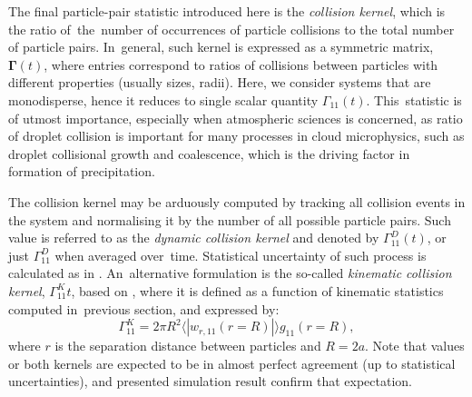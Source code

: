 \documentclass{pracamgren}
\begin{document}
The final particle-pair statistic introduced here is the \emph{collision kernel}, which is the ratio of~the~number of occurrences of particle collisions to the total number of particle pairs.
In~general, such kernel is expressed as a symmetric matrix, $\mathbf{\Gamma}(t)$, where entries correspond to ratios of collisions between particles with different properties (usually sizes, radii).
Here, we consider systems that are monodisperse, hence it reduces to single scalar quantity $\Gamma_{11}(t)$.
This~statistic is of utmost importance, especially when atmospheric sciences is concerned, as ratio of droplet collision is important for many processes in cloud microphysics, such as droplet collisional growth and coalescence, which is the driving factor in formation of precipitation.   

The collision kernel may be arduously computed by tracking all collision events in the system and normalising it by the number of all possible particle pairs.
Such value is referred to as the \emph{dynamic collision kernel} and denoted by $\Gamma^D_{11}(t)$, or just $\Gamma^D_{11}$ when averaged over~time.
Statistical uncertainty of such process is calculated as in \textcite[Equation 17]{Rosa2013}.
An~alternative formulation is the so-called \emph{kinematic collision kernel}, $\Gamma^K_{11}{t}$, based on \textcite{Sundaram1997}, where it is defined as a function of kinematic statistics computed in~previous section, and expressed by:
\begin{equation}
\Gamma^K_{11} = 2 \pi R^{2} \langle | w_{r, 11}(r = R) | \rangle g_{11}(r = R),
\label{eqn:gamma-k}
\end{equation}
where $r$ is the separation distance between particles and $R = 2a$.
Note that values or both kernels are expected to be in almost perfect agreement (up to statistical uncertainties), and presented simulation result confirm that expectation.
\end{document}

